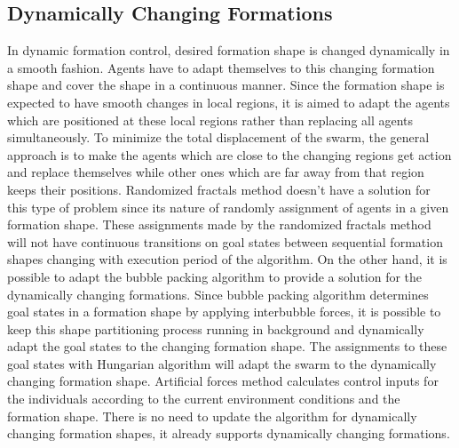 \subsection{Dynamically Changing Formations} \label{dynamical_ref}
In dynamic formation control, desired formation shape is changed dynamically in a smooth fashion. Agents have to adapt themselves to this changing formation shape and cover the shape in a continuous manner. Since the formation shape is expected to have smooth changes in local regions, it is aimed to adapt the agents which are positioned at these local regions rather than replacing all agents simultaneously. To minimize the total displacement of the swarm, the general approach is to make the agents which are close to the changing regions get action and replace themselves while other ones which are far away from that region keeps their positions. Randomized fractals method doesn't have a solution for this type of problem since its nature of randomly assignment of agents in a given formation shape. These assignments made by the randomized fractals method will not have continuous transitions on goal states between sequential formation shapes changing with execution period of the algorithm. On the other hand, it is possible to adapt the bubble packing algorithm to provide a solution for the dynamically changing formations. Since bubble packing algorithm determines goal states in a formation shape by applying interbubble forces, it is possible to keep this shape partitioning process running in background and dynamically adapt the goal states to the changing formation shape. The assignments to these goal states with Hungarian algorithm will adapt the swarm to the dynamically changing formation shape. Artificial forces method calculates control inputs for the individuals according to the current environment conditions and the formation shape. There is no need to update the algorithm for dynamically changing formation shapes, it already supports dynamically changing formations. 
		 
